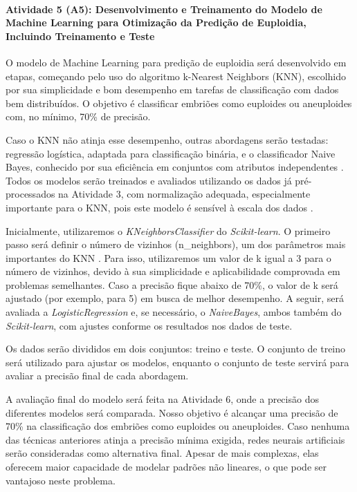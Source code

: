 \paragraph{\textbf{Atividade 5 (A5):} Desenvolvimento e Treinamento do Modelo de Machine Learning para Otimização da Predição de Euploidia, Incluindo Treinamento e Teste}

O modelo de Machine Learning para predição de euploidia será desenvolvido em etapas, começando pelo uso do algoritmo k-Nearest Neighbors (KNN), escolhido por sua simplicidade e bom desempenho em tarefas de classificação com dados bem distribuídos. O objetivo é classificar embriões como euploides ou aneuploides com, no mínimo, 70\% de precisão.

Caso o KNN não atinja esse desempenho, outras abordagens serão testadas: regressão logística, adaptada para classificação binária, e o classificador Naive Bayes, conhecido por sua eficiência em conjuntos com atributos independentes \cite{zhang2016, rodrigues, rish2001}. Todos os modelos serão treinados e avaliados utilizando os dados já pré-processados na Atividade 3, com normalização adequada, especialmente importante para o KNN, pois este modelo é sensível à escala dos dados \cite{zhang2016}.

Inicialmente, utilizaremos o \textit{KNeighborsClassifier} do \textit{Scikit-learn}. O primeiro passo será definir o número de vizinhos (n\_neighbors), um dos parâmetros mais importantes do KNN \cite{zhang2016}. Para isso,  utilizaremos um valor de k igual a 3 para o número de vizinhos, devido à sua simplicidade e aplicabilidade comprovada em problemas semelhantes. Caso a precisão fique abaixo de 70\%, o valor de k será ajustado (por exemplo, para 5) em busca de melhor desempenho. A seguir, será avaliada a \textit{LogisticRegression} e, se necessário, o \textit{NaiveBayes}, ambos também do \textit{Scikit-learn}, com ajustes conforme os resultados nos dados de teste.

Os dados serão divididos em dois conjuntos: treino e teste. O conjunto de treino será utilizado para ajustar os modelos, enquanto o conjunto de teste servirá para avaliar a precisão final de cada abordagem.

A avaliação final do modelo será feita na Atividade 6, onde a precisão dos diferentes modelos será comparada. Nosso objetivo é alcançar uma precisão de 70\% na classificação dos embriões como euploides ou aneuploides. Caso nenhuma das técnicas anteriores atinja a precisão mínima exigida, redes neurais artificiais serão consideradas como alternativa final. Apesar de mais complexas, elas oferecem maior capacidade de modelar padrões não lineares, o que pode ser vantajoso neste problema.

